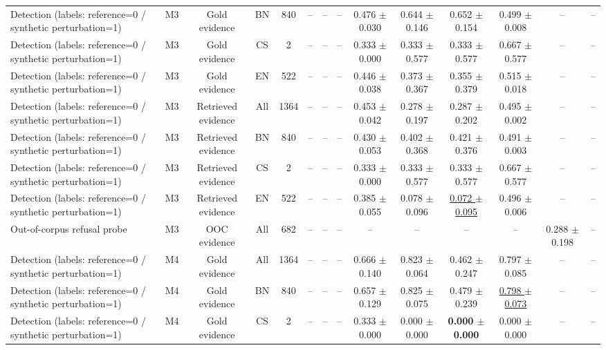 \begin{table}[t]
{\begin{tabular}{lccccccccccccc}
Detection (labels: reference=0 / synthetic perturbation=1) & M3 & Gold evidence & BN & 840 & -- & -- & -- & 0.476 $\pm$ 0.030 & 0.644 $\pm$ 0.146 & 0.652 $\pm$ 0.154 & 0.499 $\pm$ 0.008 & -- & -- \\
Detection (labels: reference=0 / synthetic perturbation=1) & M3 & Gold evidence & CS & 2 & -- & -- & -- & 0.333 $\pm$ 0.000 & 0.333 $\pm$ 0.577 & 0.333 $\pm$ 0.577 & 0.667 $\pm$ 0.577 & -- & -- \\
Detection (labels: reference=0 / synthetic perturbation=1) & M3 & Gold evidence & EN & 522 & -- & -- & -- & 0.446 $\pm$ 0.038 & 0.373 $\pm$ 0.367 & 0.355 $\pm$ 0.379 & 0.515 $\pm$ 0.018 & -- & -- \\
Detection (labels: reference=0 / synthetic perturbation=1) & M3 & Retrieved evidence & All & 1364 & -- & -- & -- & 0.453 $\pm$ 0.042 & 0.278 $\pm$ 0.197 & 0.287 $\pm$ 0.202 & 0.495 $\pm$ 0.002 & -- & -- \\
Detection (labels: reference=0 / synthetic perturbation=1) & M3 & Retrieved evidence & BN & 840 & -- & -- & -- & 0.430 $\pm$ 0.053 & 0.402 $\pm$ 0.368 & 0.421 $\pm$ 0.376 & 0.491 $\pm$ 0.003 & -- & -- \\
Detection (labels: reference=0 / synthetic perturbation=1) & M3 & Retrieved evidence & CS & 2 & -- & -- & -- & 0.333 $\pm$ 0.000 & 0.333 $\pm$ 0.577 & 0.333 $\pm$ 0.577 & 0.667 $\pm$ 0.577 & -- & -- \\
Detection (labels: reference=0 / synthetic perturbation=1) & M3 & Retrieved evidence & EN & 522 & -- & -- & -- & 0.385 $\pm$ 0.055 & 0.078 $\pm$ 0.096 & \underline{0.072 $\pm$ 0.095} & 0.496 $\pm$ 0.006 & -- & -- \\
\midrule
Out-of-corpus refusal probe & M3 & OOC evidence & All & 682 & -- & -- & -- & -- & -- & -- & -- & 0.288 $\pm$ 0.198 & -- \\
\midrule
Detection (labels: reference=0 / synthetic perturbation=1) & M4 & Gold evidence & All & 1364 & -- & -- & -- & 0.666 $\pm$ 0.140 & 0.823 $\pm$ 0.064 & 0.462 $\pm$ 0.247 & 0.797 $\pm$ 0.085 & -- & -- \\
Detection (labels: reference=0 / synthetic perturbation=1) & M4 & Gold evidence & BN & 840 & -- & -- & -- & 0.657 $\pm$ 0.129 & 0.825 $\pm$ 0.075 & 0.479 $\pm$ 0.239 & \underline{0.798 $\pm$ 0.073} & -- & -- \\
Detection (labels: reference=0 / synthetic perturbation=1) & M4 & Gold evidence & CS & 2 & -- & -- & -- & 0.333 $\pm$ 0.000 & 0.000 $\pm$ 0.000 & \textbf{0.000 $\pm$ 0.000} & 0.000 $\pm$ 0.000 & -- & -- \\

\end{tabular}}
\end{table}
